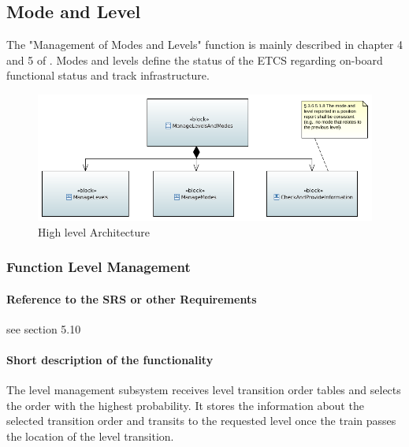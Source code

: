 \subsection{Mode and Level}


The "Management of Modes and Levels" function is mainly described in chapter 4
and 5 of \citep{subset-026}. Modes and levels define the status of the ETCS
regarding on-board functional status and track infrastructure.

\begin{landscape}
\begin{figure}[hbtp]
\centering
\includegraphics[scale=1]{../SysML/FunctionalArchitecture.png}
\caption{High level Architecture}
\end{figure}
\end{landscape}

\subsubsection{Function Level Management}%
\paragraph{Reference to the SRS or other Requirements}

see \citep{subset-026} section 5.10

\paragraph{Short description of the functionality}

The level management subsystem receives level transition order tables and selects the order with the highest probability. It stores the information about the selected transition order and transits to the requested level once the train passes the location of the level transition.

